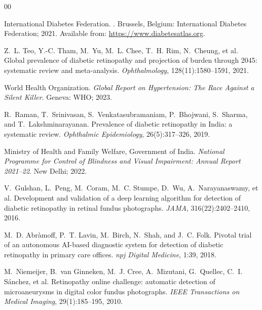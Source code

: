 \documentclass[review,12pt]{elsarticle}
\begin{document}
\begin{thebibliography}{00}

International Diabetes Federation.
.
\newblock Brussels, Belgium: International Diabetes Federation; 2021.
\newblock Available from: \url{https://www.diabetesatlas.org}.

Z.~L. Teo, Y.-C. Tham, M.~Yu, M.~L. Chee, T.~H. Rim, N.~Cheung, et al.
\newblock Global prevalence of diabetic retinopathy and projection of burden
through 2045: systematic review and meta-analysis.
\newblock \textit{Ophthalmology}, 128(11):1580--1591, 2021.

World Health Organization.
\newblock \textit{Global Report on Hypertension: The Race Against a Silent Killer}.
\newblock Geneva: WHO; 2023.

R.~Raman, T.~Srinivasan, S.~Venkatasubramaniam, P.~Bhojwani, S.~Sharma,
and T.~Lakshminarayanan.
\newblock Prevalence of diabetic retinopathy in India: a systematic review.
\newblock \textit{Ophthalmic Epidemiology}, 26(5):317--326, 2019.

Ministry of Health and Family Welfare, Government of India.
\newblock \textit{National Programme for Control of Blindness and Visual
Impairment: Annual Report 2021--22}.
\newblock New Delhi; 2022.

V.~Gulshan, L.~Peng, M.~Coram, M.~C. Stumpe, D.~Wu, A.~Narayanaswamy,
et al.
\newblock Development and validation of a deep learning algorithm for detection
of diabetic retinopathy in retinal fundus photographs.
\newblock \textit{JAMA}, 316(22):2402--2410, 2016.

M.~D. Abr{\`a}moff, P.~T. Lavin, M.~Birch, N.~Shah, and J.~C. Folk.
\newblock Pivotal trial of an autonomous AI-based diagnostic system for
detection of diabetic retinopathy in primary care offices.
\newblock \textit{npj Digital Medicine}, 1:39, 2018.

M.~Niemeijer, B.~van Ginneken, M.~J. Cree, A.~Mizutani, G.~Quellec,
C.~I. S{\'a}nchez, et al.
\newblock Retinopathy online challenge: automatic detection of microaneurysms
in digital color fundus photographs.
\newblock \textit{IEEE Transactions on Medical Imaging}, 29(1):185--195, 2010.


\end{thebibliography}
\end{document}
